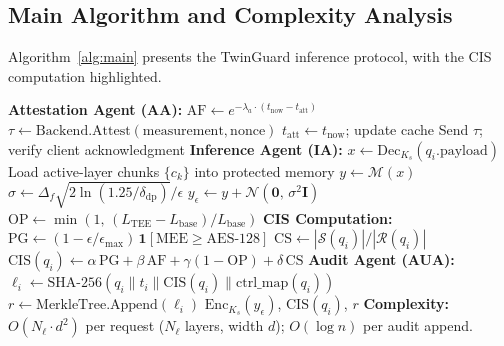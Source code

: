 \documentclass{ieeeaccess}
\begin{document}
\subsection{Main Algorithm and Complexity Analysis}

Algorithm~\ref{alg:main} presents the TwinGuard inference protocol, with the
CIS computation highlighted.

\begin{algorithm}[t]
\caption{TwinGuard Confidential Inference Protocol}
\label{alg:main}
\footnotesize
\begin{algorithmic}[1]
\Statex
\Statex \textbf{Attestation Agent (AA):}
\State $\mathrm{AF} \gets e^{-\lambda_a \cdot (t_{\text{now}} - t_{\text{att}})}$
\State $\tau \gets \text{Backend.Attest}(\text{measurement},\text{nonce})$
  \State $t_{\text{att}} \gets t_{\text{now}}$; update cache
\EndIf
\State Send $\tau$; verify client acknowledgment
\Statex
\Statex \textbf{Inference Agent (IA):}
\State $x \gets \mathrm{Dec}_{K_s}(q_i.\mathrm{payload})$
\State Load active-layer chunks $\{c_k\}$ into protected memory
\State $y \gets \mathcal{M}(x)$  
\State $\sigma \gets \Delta_f \sqrt{2\ln(1.25/\delta_{\mathrm{dp}})} / \epsilon$
\State $y_\epsilon \gets y + \mathcal{N}(\mathbf{0},\, \sigma^2 \mathbf{I})$
\State $\mathrm{OP} \gets \min(1,\, (L_\text{TEE} - L_\text{base}) / L_\text{base})$
\Statex
\Statex \textbf{CIS Computation:}
\State $\mathrm{PG} \gets (1-\epsilon/\epsilon_{\max})\,\mathbf{1}[\mathrm{MEE}\geq\mathrm{AES\text{-}128}]$
\State $\mathrm{CS} \gets |\mathcal{S}(q_i)|/|\mathcal{R}(q_i)|$
\State $\mathrm{CIS}(q_i) \gets \alpha\,\mathrm{PG}+\beta\,\mathrm{AF}+\gamma(1-\mathrm{OP})+\delta\,\mathrm{CS}$
\Statex
\Statex \textbf{Audit Agent (AUA):}
\State $\ell_i \gets \mathrm{SHA\text{-}256}(q_i\|t_i\|\mathrm{CIS}(q_i)\|\mathrm{ctrl\_map}(q_i))$
\State $r \gets \text{MerkleTree.Append}(\ell_i)$
\State \Return $\mathrm{Enc}_{K_s}(y_\epsilon)$, $\mathrm{CIS}(q_i)$, $r$
\Statex
\Statex \textbf{Complexity:} $O(N_\ell \cdot d^2)$ per request ($N_\ell$ layers, width $d$); $O(\log n)$ per audit append.
\end{algorithmic}
\end{algorithm}
\end{document}
